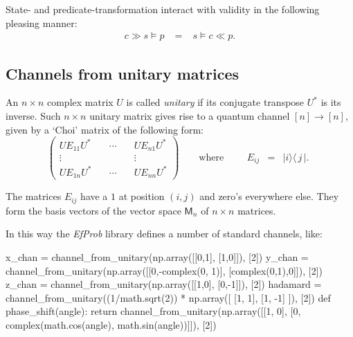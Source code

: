 \documentclass[leqno]{tufte-book} %
\newcommand{\EfProb}{\textit{EfProb}\xspace}
\newcommand{\Mat}{\mathsf{M}}
\newcommand{\ket}[1]{\ensuremath{|#1\rangle}}
\newcommand{\bra}[1]{\langle\,#1\,|}
\begin{document}
\noindent State- and predicate-transformation interact with validity
in the following pleasing manner:
\begin{equation}
\label{eqn:qvaliditytransformation}
\begin{array}{rcl}
c \gg s \models p
& \;=\; &
s \models c \ll p.
\end{array}
\end{equation}


\subsection{Channels from unitary matrices}\label{subsec:qchannel:unitaries}

An $n\times n$ complex matrix $U$ is called \emph{unitary} if its
conjugate transpose $U^*$ is its inverse. Such $n\times n$ unitary matrix
gives rise to a quantum channel $[n] \rightarrow [n]$, given by a
`Choi' matrix of the following form:
$$\left(\begin{array}{ccc}
UE_{11}U^{*} & \quad\cdots\quad & UE_{n1}U^{*}
\\
\vdots & & \vdots
\\
UE_{1n}U^{*} & \quad\cdots\quad & UE_{nn}U^{*}
\end{array}\right)
\qquad\mbox{where}\qquad
{\begin{array}{rcl}
E_{ij}
& = &
\ket{i}\bra{j}.
\end{array}}$$

\noindent The matrices $E_{ij}$ have a $1$ at position $(i,j)$ and
zero's everywhere else. They form the basis vectors of the vector
space $\Mat_{n}$ of $n\times n$ matrices.

In this way the \EfProb library defines a number of standard
channels, like:
\begin{python}
x_chan = channel_from_unitary(np.array([[0,1],
                                        [1,0]]), [2])
y_chan = channel_from_unitary(np.array([[0,-complex(0, 1)],
                                        [complex(0,1),0]]), [2])
z_chan = channel_from_unitary(np.array([[1,0],
                                        [0,-1]]), [2])
hadamard = channel_from_unitary((1/math.sqrt(2)) * np.array([ [1, 1],
                                                              [1, -1] ]), [2])
def phase_shift(angle):
    return channel_from_unitary(np.array([[1, 0],
                                          [0, complex(math.cos(angle),
                                                      math.sin(angle))]]), [2])
\end{python}
\end{document}
